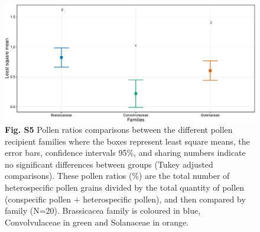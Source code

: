 \documentclass[12pt,]{article}
\begin{document}
\begin{figure}
\centering
\includegraphics{Supp_Material_files/figure-latex/unnamed-chunk-14-1.pdf}
\caption{\textbf{Fig. S5} Pollen ratios comparisons between the
different pollen recipient families where the boxes represent least
square means, the error bars, confidence intervals 95\%, and sharing
numbers indicate no significant differences between groups (Tukey
adjusted comparisons). These pollen ratios (\%) are the total number of
heterospecific pollen grains divided by the total quantity of pollen
(conspecific pollen + heterospecific pollen), and then compared by
family (N=20). Brassicacea family is coloured in blue, Convolvulaceae in
green and Solanaceae in orange.}
\end{figure}

\newpage
\end{document}
